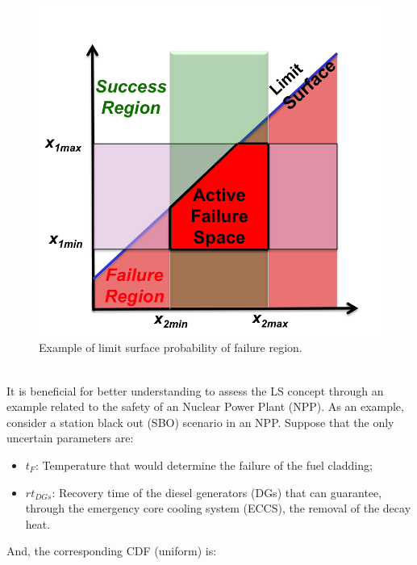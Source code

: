 \begin{figure}[h!]
  \centering
  \includegraphics[width=1.0\textwidth]  {pics/ProbabilityFailureLSExample.png}
  \caption{Example of limit surface probability of failure region.}
  \label{fig:ProbabilityFailureLSExample}
\end{figure}
\\It is beneficial for better understanding to assess the LS concept through an example related to the safety of an Nuclear Power Plant (NPP).
As an example, consider a station black out (SBO) scenario in an NPP. Suppose that the only uncertain parameters are:
\begin{itemize}
  \item $t_{F}$: Temperature that would determine the failure of the fuel cladding;
  \item $rt_{DGs}$: Recovery time of the diesel generators (DGs) that 
  can guarantee, through the emergency core cooling system (ECCS), 
  the removal of the decay heat.
\end{itemize}
And, the corresponding CDF (uniform) is:

